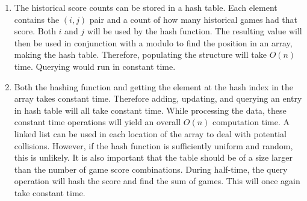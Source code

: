 \documentclass{article}
\begin{document}
\begin{enumerate}[label=\alph*.]
    \item The historical score counts can be stored in a hash table.
        Each element contains the $(i,j)$ pair and a count of how many historical games had that score.
        Both $i$ and $j$ will be used by the hash function. The resulting value will then be used in conjunction
        with a modulo to find the position in an array, making the hash table.
        Therefore, populating the structure will take $O(n)$ time. Querying would run in constant time.
    \item Both the hashing function and getting the element at the hash index in the array takes constant time.
        Therefore adding, updating, and querying an entry in hash table will all take constant time.
        While processing the data, these constant time operations will yield an overall $O(n)$ computation time.
        A linked list can be used in each location of the array to deal with potential collisions.
        However, if the hash function is sufficiently uniform and random, this is unlikely.
        It is also important that the table should be of a size larger than the number of game score combinations.
        During half-time, the query operation will hash the score and find the sum of games.
        This will once again take constant time.
\end{enumerate}
\end{document}
